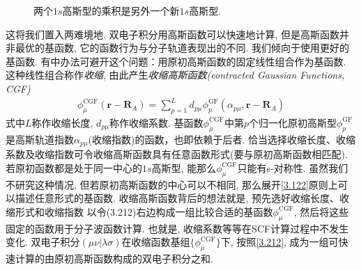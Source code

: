 \begin{figure}[h]\centering
	\def\FunctionA(x){
		3*sqrt(3)*exp(-9*x^2)*(2/3.1415)^(3/4)}
	\def\FunctionB(x){
		(4*2^(1/4))*(e^(-4*(-0.5+x)^2))/3.1415^(3/4)
	}
	\def\FunctionC(x){
		\FunctionB(x)*\FunctionA(x)/4.5
	}
	\caption{两个$1s$高斯型的乘积是另外一个新$1s$高斯型.}
	\label{f3.1}
\end{figure}
这将我们置入两难境地. 
双电子积分用高斯函数可以快速地计算, 
但是高斯函数并非最优的基函数, 
它的函数行为与分子轨道表现出的不同. 
我们倾向于使用更好的基函数. 
有中办法可避开这个问题：用原初高斯函数的固定线性组合作为基函数. 
这种线性组合称作\emph{收缩}, 
由此产生\emph{收缩高斯函数(contracted Gaussian Functions, CGF)}
\begin{align}
	\label{3.212}
	\phi_\mu^{\mathrm{CGF}}(\mathbf{r-R}_A) = \sum_{p=1}^{L}d_{p\mu}\phi_p^\mathrm{GF}(\alpha_{p\mu},\mathbf{r-R}_{A})
\end{align} 
式中$L$称作收缩长度, 
$d_{p\mu}$称作收缩系数. 
基函数$\phi_\mu^\mathrm{CGF}$中第$p$个归一化原初高斯型$\phi_p^\mathrm{GF}$是高斯轨道指数$\alpha_{p\mu}$(收缩指数)的函数，也即依赖于后者. 
恰当选择收缩长度、收缩系数及收缩指数可令收缩高斯函数具有任意函数形式(要与原初高斯函数相匹配). 
若原初函数都是处于同一中心的$1s$高斯型, 
能那么$\phi_\mu^\mathrm{CGF}$只能有s-对称性. 
虽然我们不研究这种情况, 
但若原初高斯函数的中心可以不相同, 
那么展开\autoref{3.122}原则上可以描述任意形式的基函数. 
收缩高斯函数背后的想法就是, 
预先选好收缩长度、收缩形式和收缩指数
以令(3.212)右边构成一组比较合适的基函数$\phi_\mu^\mathrm{CGF}$, 
然后将这些固定的函数用于分子波函数计算. 
也就是, 
收缩系数等等在SCF计算过程中不发生变化. 
双电子积分$(\mu\nu|\lambda\sigma)$在收缩函数基组$\{\phi_\mu^\mathrm{CGF}\}$下, 
按照\autoref{3.212}, 
成为一组可快速计算的由原初高斯函数构成的双电子积分之和. 


